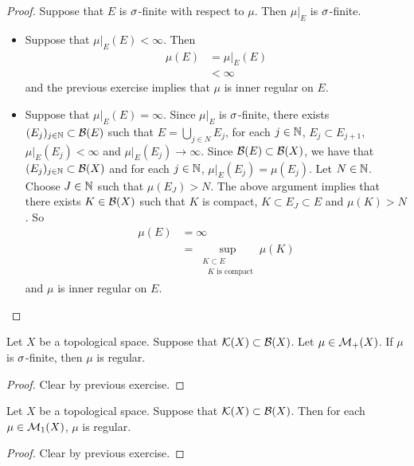 \documentclass{book}
\begin{document}
	\begin{proof}
		Suppose that $E$ is $\sigma$-finite with respect to $\mu$. Then $\mu|_E$ is $\sigma$-finite.
		\begin{itemize}
			\item Suppose that $\mu|_E(E) < \infty$. Then
			\begin{align*}
				\mu(E) 
				& = \mu|_E(E) \\
				& < \infty
			\end{align*}
			and the previous exercise implies that $\mu$ is inner regular on $E$. \\
			\item Suppose that $\mu|_E(E) = \infty$. Since $\mu|_E$ is $\sigma$-finite, there exists $(E_j)_{j \in \mathbb{N}} \subset \mathcal{B}(E)$ such that $E = \bigcup\limits_{j \in N} E_j$, for each $j \in \mathbb{N}$, $E_j \subset E_{j+1}$, $\mu|_E(E_j) < \infty$ and $\mu|_E(E_j) \rightarrow \infty$. Since $\mathcal{B}(E) \subset \mathcal{B}(X)$, we have that $(E_j)_{j \in \mathbb{N}} \subset \mathcal{B}(X)$ and for each $j \in \mathbb{N}$, $\mu|_E(E_j) = \mu(E_j)$. Let $N \in \mathbb{N}$. Choose $J \in \mathbb{N}$ such that $\mu(E_J) > N$. The above argument implies that there exists $K \in \mathcal{B}(X)$ such that $K$ is compact, $K \subset E_J \subset E$ and $\mu(K) > N$. So 
			\begin{align*}
				\mu(E)
				&= \infty \\
				&= \sup\limits_{\substack{ K \subset E \\ \text{ $K$ is compact}}} \mu(K)
			\end{align*}	 
			and $\mu$ is inner regular on $E$.  
		\end{itemize}
	\end{proof}		
	
	\begin{ex}  
		Let $X$ be a topological space. Suppose that $\mathcal{K}(X) \subset \mathcal{B}(X)$. Let $\mu \in \mathcal{M}_+(X)$. If $\mu$ is $\sigma$-finite, then $\mu$ is regular.
	\end{ex}

	\begin{proof}
		Clear by previous exercise.
	\end{proof}
	
	\begin{ex}  
		Let $X$ be a topological space. Suppose that $\mathcal{K}(X) \subset \mathcal{B}(X)$. Then for each $\mu \in \mathcal{M}_1(X)$, $\mu$ is regular.
	\end{ex}

	\begin{proof}
		Clear by previous exercise.
	\end{proof}
	
\end{document}

